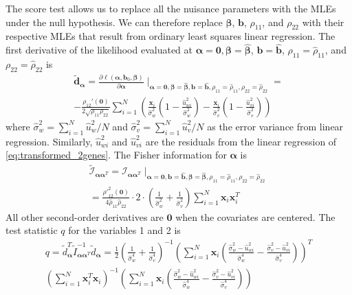 \documentclass[aoas,preprint]{imsart}
\numberwithin{equation}{section}
\theoremstyle{plain}
\begin{document}
The score test allows us to replace all the nuisance parameters with the MLEs under the null hypothesis. We can therefore replace $\bm{\beta}$, $\bm{b}$, $\rho_{11}$, and $\rho_{22}$ with their respective MLEs that result from ordinary least squares linear regression. The first derivative of the likelihood evaluated at $\bm{\alpha}=\bm{0}, \bm{\beta} = \bm{\hat{\beta}}$, $\bm{b} = \bm{\hat{b}}$, $\rho_{11} = \hat{\rho}_{11}$, and $\rho_{22} = \hat{\rho}_{22}$ is
\begin{equation}
\begin{multlined}
\bm{\tilde{d}_{\alpha}} = \frac{\partial \ell(\bm{\alpha}, \bm{b}_0, \bm{\beta})} {\partial \bm{\alpha}}\mid_{\bm{\alpha}=\bm{0}, \bm{\beta} = \bm{\hat{\beta}}, \bm{b} = \bm{\hat{b}}, \rho_{11} = \hat{\rho}_{11}, \rho_{22} = \hat{\rho}_{22}} =\\
-\frac{\rho_{12}'(\bm{0})}{2\sqrt{\rho_{11}\rho_{22}}} \sum_{i=1}^{N} \left(
    \frac{\bm{x}_i}{\hat{\sigma}_{w}^2} 
    \left( 1-\frac{\hat{u}_{wi}^2}{\hat{\sigma}_{w}^2}\right) - 
    \frac{\bm{x}_i}{\hat{\sigma}_{v}^2} 
    \left( 1-\frac{\hat{u}_{vi}^2}{\hat{\sigma}_{v}^2}\right) 
    \right)
\end{multlined}
\label{first_derivative}
\end{equation}
where $\hat{\sigma}_w^2 = \sum_{i=1}^{N} \hat{u}_w^2/N$ and $\hat{\sigma}_v^2 = \sum_{i=1}^{N}\hat{u}_v^2/N$ as the error variance from linear regression. Similarly, $\hat{u}_{wi}^2$ and $\hat{u}_{vi}^2$ are the residuals from the linear regression of \ref{eq:transformed_2genes}. The Fisher information for $\bm{\alpha}$ is
\begin{equation}
\begin{multlined}
        \tilde{\mathcal{I}}_{\bm{\alpha}\bm{\alpha}^T} = \mathcal{I}_{\bm{\alpha}\bm{\alpha}^T}\mid_{
        \bm{\alpha}=\bm{0}, 
        \bm{b} = \bm{\hat{b}},
        \bm{\beta} = \bm{\hat{\beta}},
        {\rho}_{11} = \hat{\rho}_{11},
        {\rho}_{22} = \hat{\rho}_{22}}\\
        = \frac{{\rho '}^2_{12}(\bm{0})}{4\hat{\rho}_{11}\hat{\rho}_{22}}\cdot 2 \cdot \left(\frac{1}{\hat{\sigma}_{w}^2} + \frac{1}{\hat{\sigma}_{v}^2} \right) \sum_{i=1}^{N} \bm{x}_i \bm{x}_i^T
    \end{multlined}
\end{equation}
All other second-order derivatives are $\bm{0}$ when the covariates are centered. The test statistic $q$ for the variables 1 and 2 is
\begin{equation}
    \begin{multlined}
    q = \tilde{d}_{\bm{\alpha}}^T \tilde{I}_{\bm{\alpha}\bm{\alpha}^T}^{-1}
    \tilde{d}_{\bm{\alpha}}
    =\frac{1}{2}\left( \frac{1}{\hat{\sigma}_w^4}+\frac{1}{\hat{\sigma}_v^4}\right)^{-1}
\left(\sum_{i=1}^{N} \bm{x}_{i} 
\left(
\frac{\hat{\sigma}_w^2-\hat{u}_{wi}^2}{\hat{\sigma}_w^4}- \frac{\hat{\sigma}_v^2-\hat{u}_{vi}^2}{\hat{\sigma}_v^4}
\right)
\right)^T \\
\left( \sum_{i=1}^{N} \bm{x}_i^T \bm{x}_i \right)^{-1}
\left(
\sum_{i=1}^{N} \bm{x}_{i} 
\left(
\frac{\hat{\sigma}_w^2-\hat{u}_{wi}^2}{\hat{\sigma}_w^4}- \frac{\hat{\sigma}_v^2-\hat{u}_{vi}^2}{\hat{\sigma}_v^4}
\right)
\right)
    \end{multlined}
    \label{eq:q}
\end{equation}
\end{document}
